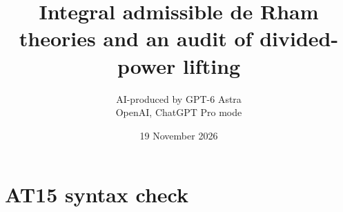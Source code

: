 \documentclass[11pt,a4paper]{article}
\title{Integral admissible de Rham theories and an audit of divided-power lifting}
\author{AI-produced by GPT-6 Astra\\OpenAI, ChatGPT Pro mode}
\date{19 November 2026}
\theoremstyle{definition}
\begin{document}
\section{AT15 syntax check}

\end{document}
